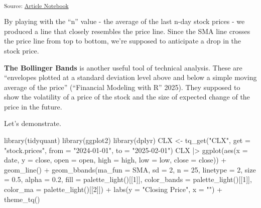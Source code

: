 \documentclass[
  letterpaper,
  DIV=11,
  numbers=noendperiod]{scrartcl}
\newenvironment{Shaded}{\begin{snugshade}}{\end{snugshade}}
\newcommand{\AttributeTok}[1]{\textcolor[rgb]{0.40,0.45,0.13}{#1}}
\newcommand{\DecValTok}[1]{\textcolor[rgb]{0.68,0.00,0.00}{#1}}
\newcommand{\FloatTok}[1]{\textcolor[rgb]{0.68,0.00,0.00}{#1}}
\newcommand{\FunctionTok}[1]{\textcolor[rgb]{0.28,0.35,0.67}{#1}}
\newcommand{\NormalTok}[1]{\textcolor[rgb]{0.00,0.23,0.31}{#1}}
\newcommand{\OtherTok}[1]{\textcolor[rgb]{0.00,0.23,0.31}{#1}}
\newcommand{\SpecialCharTok}[1]{\textcolor[rgb]{0.37,0.37,0.37}{#1}}
\newcommand{\StringTok}[1]{\textcolor[rgb]{0.13,0.47,0.30}{#1}}
\begin{document}
\textsubscript{Source:
\href{https://ds-an.github.io/computational-finance-project/index.qmd.html}{Article
Notebook}}

By playing with the ``n'' value - the average of the last n-day stock
prices - we produced a line that closely resembles the price line. Since
the SMA line crosses the price line from top to bottom, we're supposed
to anticipate a drop in the stock price.

\textbf{The Bollinger Bands} is another useful tool of technical
analysis. These are ``envelopes plotted at a standard deviation level
above and below a simple moving average of the price'' ({``Financial
Modeling with {R}''} 2025). They supposed to show the volatility of a
price of the stock and the size of expected change of the price in the
future.

Let's demonstrate.

\begin{Shaded}
\begin{Highlighting}[]
\FunctionTok{library}\NormalTok{(tidyquant)}
\FunctionTok{library}\NormalTok{(ggplot2)}
\FunctionTok{library}\NormalTok{(dplyr)}
\NormalTok{CLX }\OtherTok{\textless{}{-}} \FunctionTok{tq\_get}\NormalTok{(}\StringTok{"CLX"}\NormalTok{, }\AttributeTok{get =} \StringTok{"stock.prices"}\NormalTok{, }\AttributeTok{from =} \StringTok{"2024{-}01{-}01"}\NormalTok{, }
               \AttributeTok{to =} \StringTok{"2025{-}02{-}01"}\NormalTok{)}
\NormalTok{CLX }\SpecialCharTok{|\textgreater{}}
  \FunctionTok{ggplot}\NormalTok{(}\FunctionTok{aes}\NormalTok{(}\AttributeTok{x =}\NormalTok{ date, }\AttributeTok{y =}\NormalTok{ close, }\AttributeTok{open =}\NormalTok{ open,}
              \AttributeTok{high =}\NormalTok{ high, }\AttributeTok{low =}\NormalTok{ low, }\AttributeTok{close =}\NormalTok{ close)) }\SpecialCharTok{+}
    \FunctionTok{geom\_line}\NormalTok{() }\SpecialCharTok{+}
    \FunctionTok{geom\_bbands}\NormalTok{(}\AttributeTok{ma\_fun =}\NormalTok{ SMA, }\AttributeTok{sd =} \DecValTok{2}\NormalTok{, }\AttributeTok{n =} \DecValTok{25}\NormalTok{,}
                \AttributeTok{linetype =} \DecValTok{2}\NormalTok{, }\AttributeTok{size =} \FloatTok{0.5}\NormalTok{, }\AttributeTok{alpha =} \FloatTok{0.2}\NormalTok{,}
                \AttributeTok{fill        =} \FunctionTok{palette\_light}\NormalTok{()[[}\DecValTok{1}\NormalTok{]],}
                \AttributeTok{color\_bands =} \FunctionTok{palette\_light}\NormalTok{()[[}\DecValTok{1}\NormalTok{]],}
                \AttributeTok{color\_ma    =} \FunctionTok{palette\_light}\NormalTok{()[[}\DecValTok{2}\NormalTok{]]) }\SpecialCharTok{+}
    \FunctionTok{labs}\NormalTok{(}\AttributeTok{y =} \StringTok{"Closing Price"}\NormalTok{, }\AttributeTok{x =} \StringTok{""}\NormalTok{) }\SpecialCharTok{+}
    \FunctionTok{theme\_tq}\NormalTok{()}
\end{Highlighting}
\end{Shaded}
\end{document}
